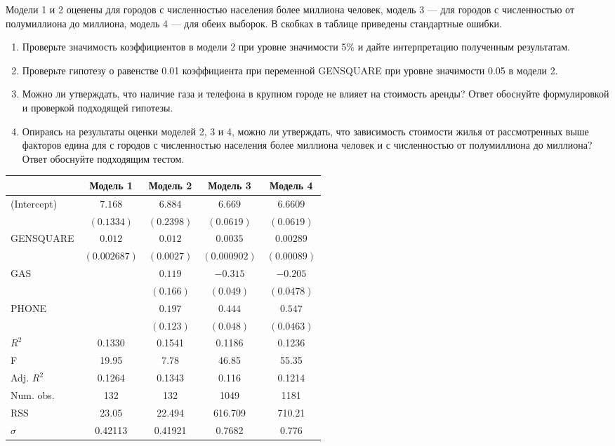 \begin{enumerate}
Модели 1 и 2 оценены для городов с численностью населения более миллиона человек, модель 3 — для городов с численностью от полумиллиона до миллиона, модель 4 — для обеих выборок. В скобках в таблице приведены стандартные ошибки.

\begin{enumerate}
\item Проверьте значимость коэффициентов в модели 2 при уровне значимости 5\% и дайте интерпретацию полученным результатам.
\item Проверьте гипотезу о равенстве 0.01 коэффициента при переменной GENSQUARE при уровне значимости 0.05 в модели 2.
\item Можно ли утверждать, что наличие газа и телефона в крупном городе не влияет на стоимость аренды? Ответ обоснуйте  формулировкой и проверкой подходящей гипотезы.
\item Опираясь на результаты оценки моделей 2, 3 и 4, можно ли утверждать, что зависимость стоимости жилья от рассмотренных выше факторов едина для с городов с численностью населения более миллиона человек и с численностью от полумиллиона до миллиона? Ответ обоснуйте подходящим тестом.
\end{enumerate}

\begin{tabular}{l c c c c }
\toprule
 & Модель 1 & Модель 2 & Модель 3 & Модель 4 \\
\midrule
(Intercept) & $7.168$      & $6.884$    & $6.669$      & $6.6609$    \\
            & $(0.1334)$   & $(0.2398)$ & $(0.0619)$   & $(0.0619)$ \\
GENSQUARE   &  $0.012$     & $0.012$    & $0.0035$     & $0.00289$   \\
            & $(0.002687)$ & $(0.0027)$ & $(0.000902)$ & $(0.00089)$ \\
GAS         &              & $0.119$    & $-0.315$      & $-0.205$    \\
            &              & $(0.166)$  & $(0.049)$    & $(0.0478)$  \\
PHONE       &              & $0.197$    & $0.444$      & $0.547$    \\
            &              & $(0.123)$  & $(0.048)$   & $(0.0463)$  \\
\midrule
$R^2$        & 0.1330         & 0.1541      & 0.1186         & 0.1236     \\
F            & 19.95          & 7.78        & 46.85          & 55.35     \\
Adj. $R^2$   & 0.1264         & 0.1343      & 0.116         & 0.1214    \\
Num. obs.    & 132            & 132         & 1049           & 1181       \\
RSS          & 23.05          & 22.494      & 616.709       & 710.21    \\
$\hat\sigma$ & 0.42113        & 0.41921     & 0.7682        & 0.776    \\
\bottomrule
\end{tabular}


\end{enumerate}

